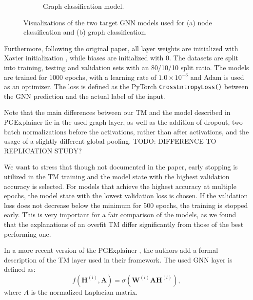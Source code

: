 \begin{figure}[htbp]
\begin{subfigure}[t]{0.48\textwidth}
\begin{tikzpicture}
        \end{tikzpicture}
        \caption{Graph classification model.}
        \label{fig:graph-classification}
    \end{subfigure}
    \caption{Visualizations of the two target GNN models used for (a) node classification and (b) graph classification.}
    \label{fig:gnn-models}
\end{figure}

Furthermore, following the original paper, all layer weights are initialized with Xavier initialization \cite{glorot2010understanding}, while biases are initialized with $0$. The datasets are split into training, testing and validation sets with an 80/10/10 split ratio. The models are trained for 1000 epochs, with a learning rate of $1.0 \times 10^{-3}$ and Adam \cite{kingma2014adam} is used as an optimizer. The loss is defined as the PyTorch \lstinline|CrossEntropyLoss()| between the GNN prediction and the actual label of the input. \bigskip

Note that the main differences between our \ac{TM} and the model described in PGExplainer \cite{luo2020parameterized} lie in the used graph layer, as well as the addition of dropout, two batch normalizations before the activations, rather than after activations, and the usage of a slightly different global pooling. TODO: DIFFERENCE TO REPLICATION STUDY?

We want to stress that though not documented in the paper, early stopping is utilized in the \ac{TM} training and the model state with the highest validation accuracy is selected. For models that achieve the highest accuracy at multiple epochs, the model state with the lowest validation loss is chosen. If the validation loss does not decrease below the minimum for 500 epochs, the training is stopped early. This is very important for a fair comparison of the models, as we found that the explanations of an overfit \ac{TM} differ significantly from those of the best performing one.\bigskip

In a more recent version of the PGExplainer \cite{10423141}, the authors add a formal description of the \ac{TM} layer used in their framework. The used GNN layer is defined as:
\begin{equation}
    f(\mathbf{H}^{(l)},\mathbf{A})=\sigma(\mathbf{W}^{(l)}\mathbf{A}\mathbf{H}^{(l)}),
\end{equation}
where $A$ is the normalized Laplacian matrix.

